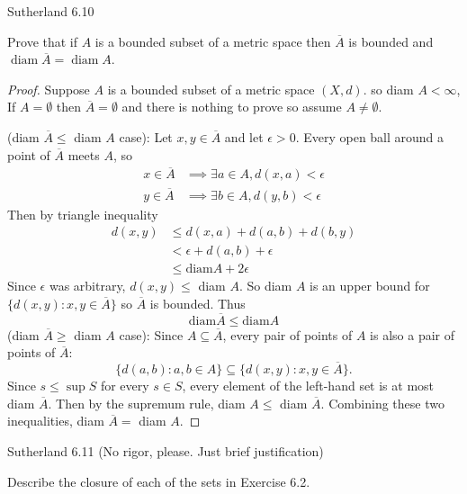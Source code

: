 \documentclass[minion]{homework}
\begin{document}
\begin{problems}

\problem Sutherland 6.10

Prove that if $A$ is a bounded subset of a metric space then $\overline{A}$ is bounded and $\operatorname{diam} \overline{A} = \operatorname{diam} A$.\newline 
\begin{proof}
  Suppose $A$ is a bounded subset of a metric space $(X,d)$. so diam $A < \infty$, If $A = \emptyset$ then $\overline{A} = \emptyset$ and there is nothing to prove so assume $A \neq \emptyset$. 

  (diam $\overline{A} \leq$ diam $A$ case): Let $x,y \in \overline{A}$ and let $\epsilon > 0$. Every open ball around a point of $\overline{A}$ meets $A$, so
  \begin{align*}
    x \in \overline{A} &\implies \exists a \in A, d(x,a) < \epsilon \\
    y \in \overline{A} &\implies \exists b \in A, d(y,b) < \epsilon 
  \end{align*}
  Then by triangle inequality
  \begin{align*}
    d(x,y) &\leq d(x,a) + d(a,b) + d(b,y) \\
           &< \epsilon + d(a,b) + \epsilon \\
           &\leq \text{diam} A + 2\epsilon
  \end{align*}
  Since $\epsilon$ was arbitrary, $d(x,y) \leq$ diam $A$. So diam $A$ is an upper bound for $\{d(x,y) : x,y \in \overline{A}\}$ so $\overline{A}$ is bounded. Thus
  $$\text{diam} \overline{A} \leq \text{diam} A $$
  (diam $\overline{A} \geq$ diam $A$ case): Since $A \subseteq \overline{A}$, every pair of points of $A$ is also a pair of points of $\overline{A}$:
  $$\{d(a,b) : a, b \in A\} \subseteq \{d(x,y) : x,y \in \overline{A}\}.$$
  Since $s \le \sup S$ for every $s \in S$, every element of the left-hand set is at most diam $\overline{A}$. Then by the supremum rule, diam $A \leq$ diam $\overline{A}.$
  Combining these two inequalities, diam $\overline{A} =$ diam $A$.


\end{proof}
\problem Sutherland 6.11 (No rigor, please. Just brief justification)

Describe the closure of each of the sets in Exercise 6.2.


\end{problems}
\end{document}
